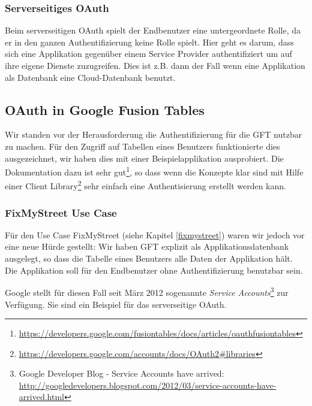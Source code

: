 \subsubsection{Serverseitiges OAuth}
Beim serverseitigen \gls{OAuth} spielt der Endbenutzer eine untergeordnete Rolle, da er in den ganzen Authentifizierung keine Rolle spielt. Hier geht es darum, dass sich eine Applikation gegenüber einem Service Provider authentifiziert um auf ihre eigene Dienste zuzugreifen. Dies ist z.B. dann der Fall wenn eine Applikation als Datenbank eine \gls{Cloud}-Datenbank benutzt.

\subsection{OAuth in Google Fusion Tables}
Wir standen vor der Herausforderung die Authentifizierung für die GFT nutzbar zu machen. Für den Zugriff auf Tabellen eines Benutzers funktionierte dies ausgezeichnet, wir haben dies mit einer Beispielapplikation ausprobiert. Die Dokumentation dazu ist sehr gut\footnote{\url{https://developers.google.com/fusiontables/docs/articles/oauthfusiontables}}, so dass wenn die Konzepte klar sind mit Hilfe einer Client Library\footnote{\url{https://developers.google.com/accounts/docs/OAuth2\#libraries}} sehr einfach eine Authentisierung erstellt werden kann.

\subsubsection{FixMyStreet Use Case}
Für den Use Case FixMyStreet (siehe Kapitel \ref{fixmystreet}) waren wir jedoch vor eine neue Hürde gestellt: Wir haben GFT explizit als Applikationsdatenbank ausgelegt, so dass die Tabelle eines Benutzers alle Daten der Applikation hält. Die Applikation soll für den Endbenutzer ohne Authentifizierung benutzbar sein.

Google stellt für diesen Fall seit März 2012 sogenannte \emph{Service Accounts}\footnote{Google Developer Blog - Service Accounts have arrived: \url{http://googledevelopers.blogspot.com/2012/03/service-accounts-have-arrived.html}} zur Verfügung. Sie sind ein Beispiel für das serverseitige \gls{OAuth}.


